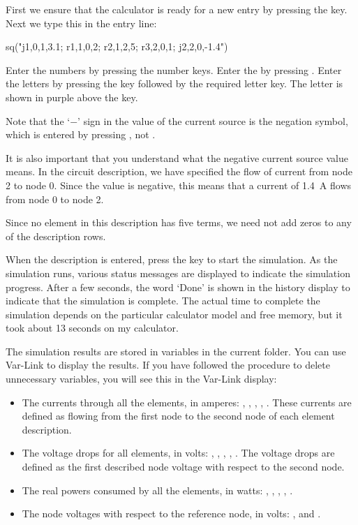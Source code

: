 First we ensure that the calculator is ready for a new entry by
pressing the  key. Next we type this in the entry line:

\begin{entry}
sq\dc("j1,0,1,3.1; r1,1,0,2; r2,1,2,5; r3,2,0,1; j2,2,0,-1.4")
\end{entry}

Enter the numbers by pressing the number keys. Enter the
 by pressing  . Enter the letters by
pressing the  key followed by the required letter key.
The letter is shown in purple above the key.

Note that the `$-$' sign in the value of the  current
source is the negation symbol, which is entered by pressing
\key{($-$)}, not \key{$-$}.

It is also important that you understand what the negative current
source value means. In the circuit description, we have specified
the flow of current from node 2 to node 0. Since the value is
negative, this means that a current of 1.4~A flows from node 0 to
node 2.

Since no element in this description has five terms, we need not add
zeros to any of the description rows.

When the description is entered, press the  key to start
the simulation. As the simulation runs, various status messages are
displayed to indicate the simulation progress. After a few seconds,
the word `Done' is shown in the history display to indicate that the
simulation is complete. The actual time to complete the simulation
depends on the particular calculator model and free memory, but it
took about 13 seconds on my calculator.

The simulation results are stored in variables in the current
folder. You can use Var-Link to display the results. If you have
followed the procedure to delete unnecessary variables, you will see
this in the Var-Link display:

\begin{itemize}
\item The currents through all the elements, in amperes: ,
  , , , . These currents are
  defined as flowing from the first node to the second node of each
  element description.
\item The voltage drops for all elements, in volts: ,
  , , , . The voltage drops
  are defined as the first described node voltage with respect to
  the second node.
\item The real powers consumed by all the elements, in watts:
  , , , , .
\item The node voltages with respect to the reference node, in
  volts: ,  and .
\end{itemize}

